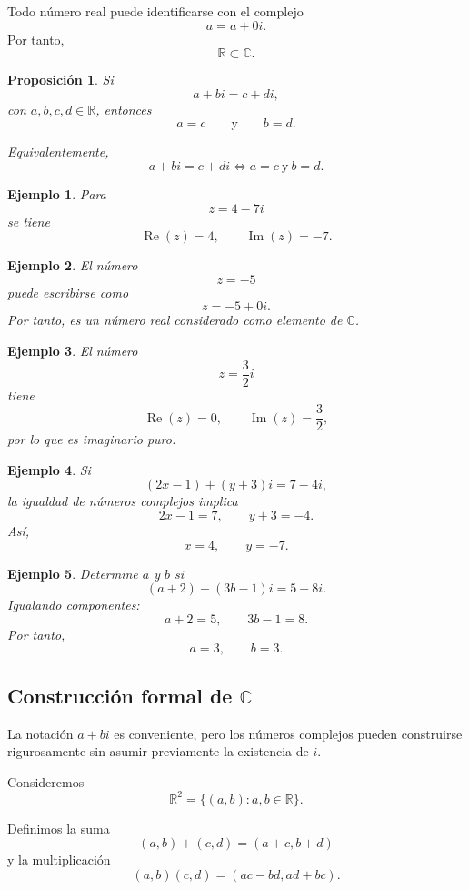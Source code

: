 \documentclass[12pt]{article}
\newtheorem{Ejem}{Ejemplo}
\newtheorem{Prop}{Proposici\'on}
\begin{document}
Todo número real puede identificarse con el complejo
\[
a=a+0i.
\]
Por tanto,
\[
\boxed{\mathbb{R}\subset\mathbb{C}.}
\]

\begin{Prop}
Si
\[
a+bi=c+di,
\]
con $a,b,c,d\in\mathbb{R}$, entonces
\[
a=c
\qquad\text{y}\qquad
b=d.
\]

Equivalentemente,
\[
\boxed{
a+bi=c+di
\iff
a=c\ \text{y}\ b=d.
}
\]
\end{Prop}

\begin{Ejem}
Para
\[
z=4-7i
\]
se tiene
\[
\operatorname{Re}(z)=4,
\qquad
\operatorname{Im}(z)=-7.
\]
\end{Ejem}

\begin{Ejem}
El número
\[
z=-5
\]
puede escribirse como
\[
z=-5+0i.
\]
Por tanto, es un número real considerado como elemento de $\mathbb{C}$.
\end{Ejem}

\begin{Ejem}
El número
\[
z=\frac32 i
\]
tiene
\[
\operatorname{Re}(z)=0,
\qquad
\operatorname{Im}(z)=\frac32,
\]
por lo que es imaginario puro.
\end{Ejem}

\begin{Ejem}
Si
\[
(2x-1)+(y+3)i=7-4i,
\]
la igualdad de números complejos implica
\[
2x-1=7,
\qquad
y+3=-4.
\]
Así,
\[
\boxed{x=4,\qquad y=-7.}
\]
\end{Ejem}

\begin{Ejem} Determine $a$ y $b$ si
\[
(a+2)+(3b-1)i=5+8i.
\]
Igualando componentes:
\[
a+2=5,
\qquad
3b-1=8.
\]
Por tanto,
\[
\boxed{a=3,\qquad b=3.}
\]
\end{Ejem}

\subsection*{Construcción formal de $\mathbb{C}$}

La notación $a+bi$ es conveniente, pero los números complejos pueden
construirse rigurosamente sin asumir previamente la existencia de $i$.

Consideremos
\[
\mathbb{R}^2
=
\{(a,b):a,b\in\mathbb{R}\}.
\]

Definimos la suma
\[
(a,b)+(c,d)
=
(a+c,b+d)
\]
y la multiplicación
\[
\boxed{
(a,b)(c,d)
=
(ac-bd,ad+bc).
}
\]
\end{document}
